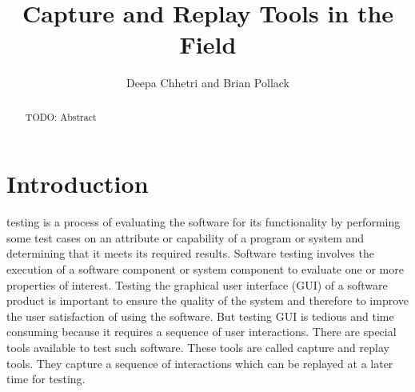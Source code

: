 \documentclass[10pt,journal]{IEEEtran}
\begin{document}
\title{Capture and Replay Tools in the Field}
\author{Deepa Chhetri and Brian Pollack}
\maketitle

\begin{abstract}
TODO: Abstract
\end{abstract}

\section{Introduction}

 testing is a process of  evaluating the software for its functionality by performing some test cases on an attribute or capability of a program or system and determining that it meets its required results. Software testing involves the execution of a software component or system component to evaluate one or more properties of interest. Testing the graphical user interface (GUI) of a software product is important to ensure the quality of the system and therefore to improve the user satisfaction of using the software\cite{Nedyalkova:2013:OSC:2494444.2494464}. But testing GUI is tedious and time consuming because it requires a sequence of user interactions. There are special tools available to test such software. These tools are called capture and replay tools. They capture a sequence of interactions which can be replayed at a later time for testing.
\end{document}
